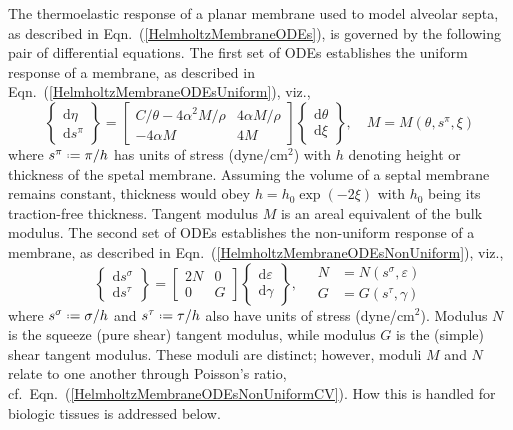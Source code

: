 The thermo\-elastic response of a planar membrane used to model alveolar septa, as described in Eqn.~(\ref{HelmholtzMembraneODEs}), is governed by the following pair of differential equations.  The first set of ODEs establishes the uniform response of a membrane, as described in Eqn.~(\ref{HelmholtzMembraneODEsUniform}), viz.,
\begin{displaymath}
    \left\{ \begin{matrix}
    \mathrm{d} \eta \\ \mathrm{d} s^{\pi}
    \end{matrix} \right\} = \begin{bmatrix}
    C / \theta - 4 \alpha^2 M / \rho & 
    4 \alpha M / \rho \\
    -4 \alpha M & 4 M
    \end{bmatrix} \left\{ \begin{matrix}
    \mathrm{d} \theta \\ \mathrm{d} \xi
    \end{matrix} \right\} , \quad
    M = M ( \theta , s^{\pi} , \xi )
\end{displaymath}
where $s^{\pi} \defeq \pi / h$ has units of stress (dyne/$\text{cm}^2$) with $h$ denoting height or thickness of the spetal membrane.  Assuming the volume of a septal membrane remains constant, thickness would obey $h = h_0 \exp ( -2 \xi )$ with $h_0$ being its traction-free thickness.  Tangent modulus $M$ is an areal equivalent of the bulk modulus.  The second set of ODEs establishes the non-uniform response of a membrane, as described in Eqn.~(\ref{HelmholtzMembraneODEsNonUniform}), viz.,
\begin{displaymath}
    \left\{ \begin{matrix}
    \mathrm{d} s^{\sigma} \\ \mathrm{d} s^{\tau}
    \end{matrix} \right\} = \begin{bmatrix}
    2N & 0 \\
    0 & G
    \end{bmatrix} \left\{ \begin{matrix}
    \mathrm{d} \varepsilon \\ \mathrm{d} \gamma
    \end{matrix} \right\} , \quad
    \begin{aligned}
        N & = N ( s^{\sigma} , \varepsilon ) \\
        G & = G ( s^{\tau} , \gamma )
    \end{aligned}
\end{displaymath}
where $s^{\sigma} \defeq \sigma / h$ and $s^{\tau} \defeq \tau / h$ also have units of stress (dyne/$\text{cm}^2$).  Modulus $N$ is the squeeze (pure shear) tangent modulus, while modulus $G$ is the (simple) shear tangent modulus.  These moduli are distinct; however, moduli $M$ and $N$ relate to one another through Poisson's ratio, cf.\ Eqn.~(\ref{HelmholtzMembraneODEsNonUniformCV}).  How this is handled for biologic tissues is addressed below.

